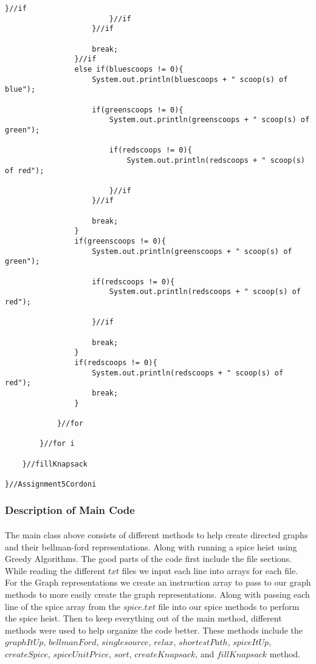 \documentclass[letterpaper, 10pt,DIV=13]{scrartcl}
\numberwithin{equation}{section} %
\numberwithin{figure}{section} %
\numberwithin{table}{section} %
\begin{document}
\begin{lstlisting}[frame=single, ]
                            }//if
                        }//if
                    }//if

                    break;
                }//if
                else if(bluescoops != 0){
                    System.out.println(bluescoops + " scoop(s) of blue");

                    if(greenscoops != 0){
                        System.out.println(greenscoops + " scoop(s) of green");

                        if(redscoops != 0){
                            System.out.println(redscoops + " scoop(s) of red");
                            
                        }//if
                    }//if

                    break;
                }
                if(greenscoops != 0){
                    System.out.println(greenscoops + " scoop(s) of green");

                    if(redscoops != 0){
                        System.out.println(redscoops + " scoop(s) of red");
                        
                    }//if

                    break;
                }
                if(redscoops != 0){
                    System.out.println(redscoops + " scoop(s) of red");
                    break;
                }

            }//for
           
        }//for i   

    }//fillKnapsack

}//Assignment5Cordoni

\end{lstlisting}

\subsubsection{Description of Main Code}
\paragraph{} The main class above consists of different methods to help create directed graphs and their bellman-ford representations. Along with running a spice heist using Greedy Algorithms. The good parts of the code first include the file sections. While reading the different $txt$ files we input each line into arrays for each file. For the Graph representations we create an instruction array to pass to our graph methods to more easily create the graph representations. Along with passing each line of the spice array from the $spice.txt$ file into our spice methods to perform the spice heist. Then to keep everything out of the main method, different methods were used to help organize the code better. These methods include the $graphItUp$, $bellmanFord$, $singlesource$, $relax$, $shortestPath$, $spiceItUp$, $createSpice$, $spiceUnitPrice$, $sort$, $createKnapsack$, and $fillKnapsack$ method.
\end{document}
